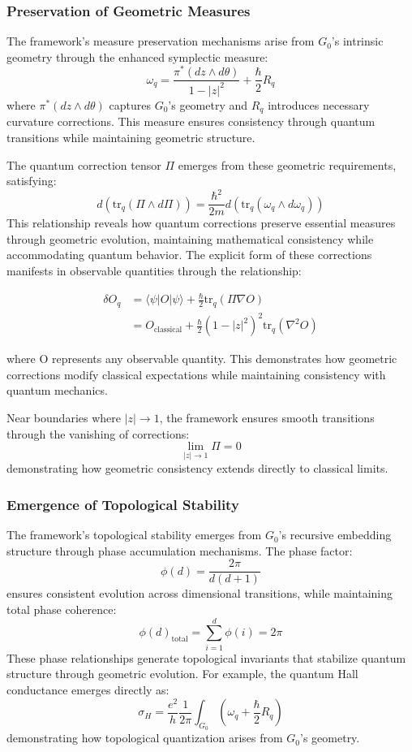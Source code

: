 \documentclass[10pt]{article}
\begin{document}
\subsubsection{Preservation of Geometric Measures}

The framework's measure preservation mechanisms arise from \(G_0\)'s intrinsic geometry through the enhanced symplectic measure:
\[
\omega_q = \frac{\pi^*(dz \wedge d\theta)}{1 - |z|^2} + \frac{\hbar}{2} R_q
\]
where \(\pi^*(dz \wedge d\theta)\) captures \(G_0\)'s geometry and \(R_q\) introduces necessary curvature corrections. This measure ensures consistency through quantum transitions while maintaining geometric structure.

The quantum correction tensor \(\Pi\) emerges from these geometric requirements, satisfying:
\[
d(\text{tr}_q(\Pi \wedge d\Pi)) = \frac{\hbar^2}{2m} d(\text{tr}_q(\omega_q \wedge d\omega_q))
\]
This relationship reveals how quantum corrections preserve essential measures through geometric evolution, maintaining mathematical consistency while accommodating quantum behavior. The explicit form of these corrections manifests in observable quantities through the relationship:

\[\begin{aligned}
\delta O_q &= \langle \psi | O | \psi \rangle + \frac{\hbar}{2}\text{tr}_q(\Pi \nabla O) \\
&= O_{\text{classical}} + \frac{\hbar}{2}(1-|z|^2)^2\text{tr}_q(\nabla^2 O)
\end{aligned}\]

where O represents any observable quantity. This demonstrates how geometric corrections modify classical expectations while maintaining consistency with quantum mechanics.

Near boundaries where \(|z| \to 1\), the framework ensures smooth transitions through the vanishing of corrections:
\[
\lim_{|z| \to 1} \Pi = 0
\]
demonstrating how geometric consistency extends directly to classical limits.

\subsubsection{Emergence of Topological Stability}

The framework's topological stability emerges from \(G_0\)'s recursive embedding structure through phase accumulation mechanisms. The phase factor:
\[
\phi(d) = \frac{2\pi}{d(d+1)}
\]
ensures consistent evolution across dimensional transitions, while maintaining total phase coherence:
\[
\phi(d)_{\text{total}} = \sum_{i=1}^d \phi(i) = 2\pi
\]
These phase relationships generate topological invariants that stabilize quantum structure through geometric evolution. For example, the quantum Hall conductance emerges directly as:
\[
\sigma_H = \frac{e^2}{h} \frac{1}{2\pi} \int_{G_0} \left(\omega_q + \frac{\hbar}{2} R_q\right)
\]
demonstrating how topological quantization arises from \(G_0\)'s geometry.
\end{document}
